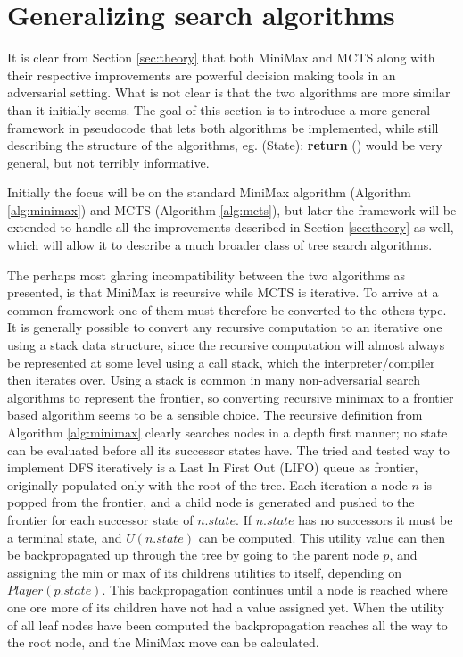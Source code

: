 \section{Generalizing search algorithms}
\label{sec:generalizing}

It is clear from Section \ref{sec:theory} that both MiniMax and MCTS along with their respective improvements are powerful decision making tools in an adversarial setting. What is not clear is that the two algorithms are more similar than it initially seems. The goal of this section is to introduce a more general framework in pseudocode that lets both algorithms be  implemented, while still describing the structure of the algorithms, eg. (State): \textbf{return} () would be very general, but not terribly informative.

Initially the focus will be on the standard MiniMax algorithm (Algorithm \ref{alg:minimax}) and MCTS (Algorithm \ref{alg:mcts}), but later the framework will be extended to handle all the improvements described in Section \ref{sec:theory} as well, which will allow it to describe a much broader class of tree search algorithms.

The perhaps most glaring incompatibility between the two algorithms as presented, is that MiniMax is recursive while MCTS is iterative. To arrive at a common framework one of them must therefore be converted to the others type. It is generally possible to convert any recursive computation to an iterative one using a stack data structure, since the recursive computation will almost always be represented at some level using a call stack, which the interpreter/compiler then iterates over. Using a stack is common in many non-adversarial search algorithms to represent the frontier, so converting recursive minimax to a frontier based algorithm seems to be a sensible choice. The recursive definition from Algorithm \ref{alg:minimax} clearly searches nodes in a depth first manner; no state can be evaluated before all its successor states have. The tried and tested way to implement DFS iteratively is a Last In First Out (LIFO) queue as frontier, originally populated only with the root of the tree. Each iteration a node $n$ is popped from the frontier, and a child node is generated and pushed to the frontier for each successor state of $n.state$. If $n.state$ has no successors it must be a terminal state, and $U(n.state)$ can be computed. This utility value can then be backpropagated up through the tree by going to the parent node $p$, and assigning the min or max of its childrens utilities to itself, depending on $Player(p.state)$. This backpropagation continues until a node is reached where one ore more of its children have not had a value assigned yet. When the utility of all leaf nodes have been computed the backpropagation reaches all the way to the root node, and the MiniMax move can be calculated.

